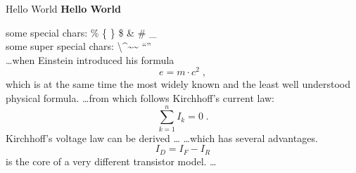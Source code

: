 \documentclass{article}
\begin{document}
Hello World\newline
\textbf{Hello World}\newline

some special chars: \% \{ \} \$ \& \# \_ \\
some super special chars: \textbackslash  \textasciicircum  \textasciitilde \~{}  ``'' \\
\ldots when Einstein introduced his formula
\begin{equation}
	e = m \cdot c^2 \; ,
\end{equation}
which is at the same time the most widely known
and the least well understood physical formula.
\ldots from which follows Kirchhoff's current law:
\begin{equation}
	\sum_{k=1}^{n} I_k = 0 \; .
\end{equation}
Kirchhoff's voltage law can be derived \ldots
\ldots which has several advantages.
\begin{equation}
	I_D = I_F - I_R
\end{equation}
is the core of a very different transistor model. \ldots
\end{document}
